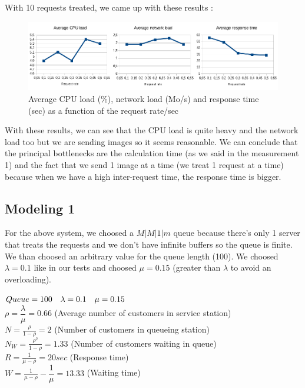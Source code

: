 \documentclass[11pt,a4paper]{article}
\begin{document}
With 10 requests treated, we came up with these results :

\begin{figure}[h!]
\centering
\includegraphics[width=14cm]{measurement2.png}
\caption{Average CPU load (\%), network load (Mo/s) and response time (sec) as a function of the request rate/sec}
\end{figure}

With these results, we can see that the CPU load is quite heavy and the network load too but we are sending images so it seems reasonable. We can conclude that the principal bottlenecks are the calculation time (as we said in the measurement 1) and the fact that we send 1 image at a time (we treat 1 request at a time) because when we have a high inter-request time, the response time is bigger.

\subsection{Modeling 1}

For the above system, we choosed a $ M|M|1|m $ queue because there's only 1 server that treats the requests and we don't have infinite buffers so the queue is finite. We than choosed an arbitrary value for the queue length (100). We choosed $ \lambda = 0.1 $ like in our tests and choosed $ \mu = 0.15 $ (greater than $ \lambda $ to avoid an overloading).\\

\begin{center}
$ Queue = 100 \hspace{10px}  \lambda = 0.1 \hspace{10px} \mu = 0.15 $\\
$ \rho = \dfrac{\lambda}{\mu} = 0.66 $ (Average number of customers in service station)\\
$ N = \frac{\rho}{1-\rho} = 2 $ (Number of customers in queueing station)\\
$ N_{W} = \frac{\rho^{2}}{1-\rho} = 1.33 $ (Number of customers waiting in queue)\\
$ R = \frac{1}{\mu - \rho} = 20 sec $ (Response time)\\
$ W = \frac{1}{\mu - \rho} - \dfrac{1}{\mu} = 13.33 $ (Waiting time)
\end{center}
\end{document}

